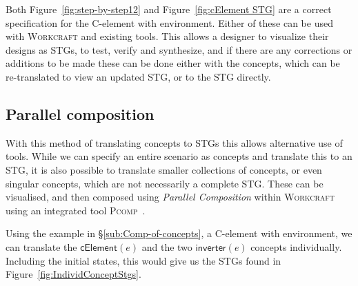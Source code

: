 \documentclass[british,compsoc]{IEEEtran}
\newcommand{\noun}[1]{\textsc{#1}}
\begin{document}
Both Figure~\ref{fig:step-by-step12} and Figure~\ref{fig:cElement STG} are a correct specification for the C-element with environment. Either of these can be used with
\noun{Workcraft} and existing tools. This allows a designer to visualize their designs as STGs, to test, verify and synthesize, and if there are any corrections or additions to be made
these can be done either with the concepts, which can be re-translated to view an updated STG, or to the STG directly.



\subsection{Parallel composition}

With this method of translating concepts to STGs this allows alternative use of tools. While we can specify an entire scenario as concepts and translate this to an STG, it is also possible to
translate smaller collections of concepts, or even singular concepts, which are not necessarily a complete STG. These can be visualised, and then composed using
\emph{Parallel Composition}
within \noun{Workcraft} using an integrated tool \noun{Pcomp}~\cite{PCOMP}.

Using the example in \S\ref{sub:Comp-of-concepts}, a C-element with environment, we can translate the $\mathsf{cElement}(e)$ and the two $\mathsf{inverter}(e)$ concepts
individually. Including the initial states, this would give us the STGs found in Figure~\ref{fig:IndividConceptStgs}.
\end{document}

